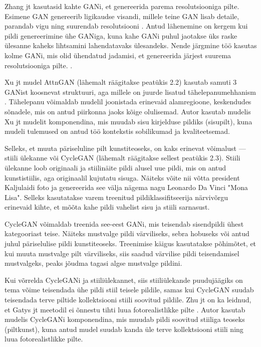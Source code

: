\documentclass{vilgym}
\begin{document}
	Zhang jt kasutasid kahte GANi, et genereerida parema resolutsiooniga pilte. Esimene GAN genereerib ligikaudse visandi, millele teine GAN lisab detaile, parandab vigu ning suurendab resolutsiooni \parencite{stackgan}. Antud lähenemine on kergem kui pildi genereerimine ühe GANiga, kuna kahe GANi puhul jaotakse üks raske ülesanne kaheks lihtsamini lahendatavaks ülesandeks. Nende järgmine töö kasutas kolme GANi, mis olid ühendatud jadamisi, et genereerida järjest suurema resolutsiooniga pilte. \parencite{stackgan2}.

	Xu jt mudel AttnGAN (lähemalt räägitakse peatükis 2.2) kasutab samuti 3 GANist koosnevat struktuuri, aga millele on juurde lisatud tähelepanumehhanism  \parencite{attngan}. Tähelepanu võimaldab mudelil joonistada erinevaid alamregioone, keskendudes sõnadele, mis on antud piirkonna jaoks kõige olulisemad. Autor kasutab mudelis Xu jt mudelit komponendina, mis muudab sisu kirjelduse pildiks (sisu\textrightarrow pilt), kuna mudeli tulemused on antud töö kontekstis sobilikumad ja kvaliteetsemad.

	Selleks, et muuta päriseluline pilt kunstiteoseks, on kaks erinevat võimalust --- stiili ülekanne  või CycleGAN (lähemalt räägitakse sellest peatükis 2.3). Stiili ülekanne loob originaali ja stiilinäite pildi alusel uue pildi, mis on antud kunstistiilis, aga originaalil kujutatu sisuga. Näiteks võite nii võtta president Kaljulaidi foto ja genereerida see välja nägema nagu Leonardo Da Vinci "Mona Lisa". Selleks kasutatakse varem treenitud pildiklassifitseerija närvivõrgu erinevaid kihte, et mõõta kahe pildi vahelist sisu ja stiili sarnasust. \parencite{styletransfer}

	CycleGAN võimaldab treenida see-eest GANi, mis teisendab sisendpildi ühest kategooriast teise. Näiteks mustvalge pildi värviliseks, sebra hobuseks või antud juhul päriselulise pildi kunstiteoseks. Treenimise käigus kasutatakse põhimõtet, et kui muuta mustvalge pilt värviliseks, siis saadud värvilise pildi teisendamisel mustvalgeks, peaks jõudma tagasi algse mustvalge pildini. \parencite{cyclegan}

	Kui võrrelda CycleGANi ja stiiliülekannet, siis stiiliülekande puudujäägiks on tema võime teisendada ühe pildi stiil teisele pildile, samas kui CycleGAN suudab teisendada terve piltide kollektsiooni stiili soovitud pildile. Zhu jt on ka leidnud, et Gatys jt meetodil ei õnnestu tihti luua fotorealistlikke pilte \parencite{cyclegan, styletransfer}. Autor kasutab mudelis CycleGANi komponendina, mis muudab pildi soovitud stiiliga teoseks (pilt\textrightarrow kunst), kuna antud mudel suudab kanda üle terve kollektsiooni stiili ning luua fotorealistlikke pilte.
\end{document}
